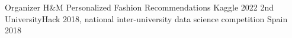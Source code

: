 


\begin{cvhonors}

  \cvhonor
    {Organizer} %
    {H\&M Personalized Fashion Recommendations
} %
    {Kaggle} %
    {2022} %
  \cvhonor
    {2nd} %
    {UniversityHack 2018, national inter-university data science competition} %
    {Spain} %
    {2018} %

\end{cvhonors}